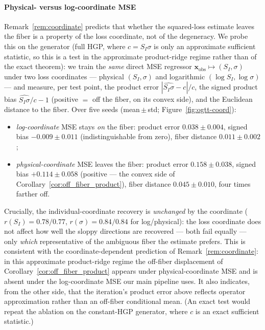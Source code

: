 \paragraph{Physical- versus log-coordinate MSE} Remark~\ref{rem:coordinate} predicts that whether the
squared-loss estimate leaves the fiber is a property of the loss coordinate, not of the degeneracy. We
probe this on the generator (full HGP, where $c=S_I\sigma$ is only an approximate sufficient statistic, so
this is a test in the approximate product-ridge regime rather than of the exact theorem): we train the
\emph{same} direct MSE regressor $\mathbf{x}_\mathrm{obs}\mapsto(S_I,\sigma)$
under two loss coordinates --- physical $(S_I,\sigma)$ and logarithmic $(\log S_I,\log\sigma)$ --- and
measure, per test point, the product error $|\widehat{S_I\sigma}-c|/c$, the signed product bias
$\widehat{S_I\sigma}/c-1$ (positive $=$ off the fiber, on its convex side), and the Euclidean distance to
the fiber. Over five seeds (mean\,$\pm$\,std; Figure~\ref{fig:ogtt-coord}):
\begin{itemize}
\item \emph{log-coordinate} MSE stays \emph{on} the fiber: product error $0.038\pm0.004$, signed bias
$-0.009\pm0.011$ (indistinguishable from zero), fiber distance $0.011\pm0.002$;
\item \emph{physical-coordinate} MSE leaves the fiber: product error $0.158\pm0.038$, signed bias
$+0.114\pm0.058$ (positive --- the convex side of Corollary~\ref{cor:off_fiber_product}), fiber distance
$0.045\pm0.010$, four times farther off.
\end{itemize}
Crucially, the individual-coordinate recovery is \emph{unchanged} by the coordinate
($r(S_I)=0.78/0.77$, $r(\sigma)=0.84/0.84$ for log/physical): the loss coordinate does not affect how well
the sloppy directions are recovered --- both fail equally --- only \emph{which} representative of the
ambiguous fiber the estimate prefers. This is consistent with the coordinate-dependent prediction of
Remark~\ref{rem:coordinate}: in this approximate product-ridge regime the off-fiber displacement of
Corollary~\ref{cor:off_fiber_product} appears under physical-coordinate MSE and is absent under the
log-coordinate MSE our main pipeline uses. It also indicates, from the other side, that the iteration's
product error above reflects operator approximation rather than an off-fiber conditional mean. (An
exact test would repeat the ablation on the constant-HGP generator, where $c$ is an exact sufficient
statistic.)

